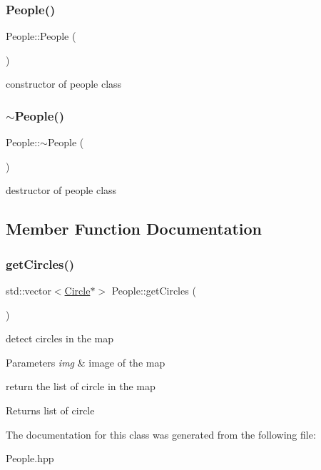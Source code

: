 \subsubsection{\texorpdfstring{People()}{People()}}
{\footnotesize\ttfamily People\+::\+People (\begin{DoxyParamCaption}{ }\end{DoxyParamCaption})}

constructor of people class \mbox{\label{class_people_adae124857f64dadff4e1801410b3dab2}} 
\subsubsection{\texorpdfstring{$\sim$\+People()}{~People()}}
{\footnotesize\ttfamily People\+::$\sim$\+People (\begin{DoxyParamCaption}{ }\end{DoxyParamCaption})}

destructor of people class 

\subsection{Member Function Documentation}
\mbox{\label{class_people_a55604e9d3aa4a772b5d8d97ead9493b0}} 
\subsubsection{\texorpdfstring{get\+Circles()}{getCircles()}}
{\footnotesize\ttfamily std\+::vector$<$\mbox{\hyperlink{class_circle}{Circle}}$\ast$$>$ People\+::get\+Circles (\begin{DoxyParamCaption}{ }\end{DoxyParamCaption})}

detect circles in the map 
\begin{DoxyParams}{Parameters}
{\em img} & image of the map\\
\hline
\end{DoxyParams}
return the list of circle in the map \begin{DoxyReturn}{Returns}
list of circle 
\end{DoxyReturn}


The documentation for this class was generated from the following file\+:\begin{DoxyCompactItemize}
\item 
People.\+hpp\end{DoxyCompactItemize}
